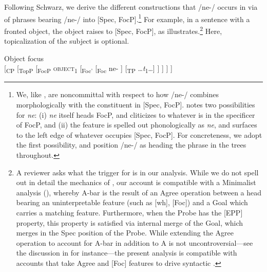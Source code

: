 \documentclass[output=paper,modfonts]{langscibook}
\begin{document}
\hspace*{10mm}

Following Schwarz, we derive the different constructions that /ne-/ occurs in via  of phrases bearing /ne-/ into [Spec, FocP].\footnote{We, like \citet{Schwarz2007}, are noncommittal with respect to how /ne-/ combines morphologically with the constituent in [Spec, FocP]. \citet[144]{Schwarz2007} notes two possibilities for  \textit{ne}: (i) \textit{ne} itself heads FocP, and cliticizes to whatever is in the specificer of FocP, and (ii) the  feature is spelled out phonologically as \textit{ne}, and surfaces to the left edge of whatever occupies [Spec, FocP]. For concreteness, we adopt the first possibility, and position /ne-/ as heading the  phrase in the trees throughout.}  For example, in a sentence with a fronted object, the object raises to [Spec, FocP], as  illustrates.\footnote{A reviewer asks what the trigger for  is in our analysis. While we do not spell out in detail the mechanics of , our account is compatible with a Minimalist analysis (\citealt{Chomsky2000,Chomsky2004}), whereby A-bar  is the result of an Agree operation between a head bearing an uninterpretable feature (such as [wh], [Foc]) and a Goal which carries a matching feature. Furthermore, when the Probe has the [EPP] property, this property is satisfied via internal merge of the Goal, which merges in the Spec position of the Probe. While extending the Agree operation to account for A-bar  in addition to A  is not uncontroversial—see the discussion in \citealt{Horvath2007} for instance—the present analysis is compatible with accounts that take Agree and [Foc] features to drive syntactic .} Here, topicalization of the subject is optional.

\ea\label{ex:landmann:27} 
{Object focus}\\{}
[{\textsubscript{CP}} 
 [{\textsubscript{TopP}} 
  [{\textsubscript{FocP}} \textsc{object}{\textsubscript{1}} 
   [{\textsubscript{Foc}}{\textsubscript{'}} 
    [{\textsubscript{Foc}} ne- ]{} 
    [{\textsubscript{TP}} …\textit{t}{\textsubscript{1}}…]{}
   ]
  ]
 ]
]
\z
\end{document}
